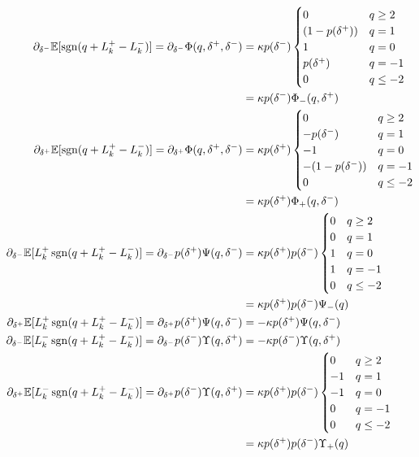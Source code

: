 \begin{align}
\partial_{\delta^-} \mathbb{E} [\operatorname{\mathrm{sgn}}(q + L_k^+ - L_k^-)] = \partial_{\delta^-} \Phi(q, \delta^+, \delta^-) & = \kappa p(\delta^-) \begin{cases} 
0 & q \geq 2 \\
(1-p(\delta^+)) & q = 1 \\
1 & q = 0 \\
p(\delta^+)  & q = -1 \\
0 & q \leq -2
\end{cases} \\
& = \kappa p(\delta^-) \Phi_-(q,\delta^+) \\
\partial_{\delta^+} \mathbb{E} [\operatorname{\mathrm{sgn}}(q + L_k^+ - L_k^-)] =\partial_{\delta^+} \Phi(q, \delta^+, \delta^-) & =  \kappa p(\delta^+) \begin{cases} 
0 & q \geq 2 \\
- p(\delta^-) & q = 1 \\
- 1 & q = 0 \\
- (1 - p(\delta^-)) & q = -1 \\
0 & q \leq -2
\end{cases} \\
& = \kappa p(\delta^+)\Phi_+(q,\delta^-) \\
\partial_{\delta^-} \mathbb{E} [L_k^+ \operatorname{\mathrm{sgn}}(q + L_k^+ - L_k^-)] = \partial_{\delta^-} p(\delta^+) \Psi(q, \delta^-) & = \kappa p(\delta^+) p(\delta^-)\begin{cases} 
0 & q \geq 2 \\
0 & q = 1 \\
1 & q = 0 \\
1 & q = -1 \\
0 & q \leq -2
\end{cases} \\
& = \kappa p(\delta^+) p(\delta^-) \Psi_-(q) \\
\partial_{\delta^+} \mathbb{E} [L_k^+ \operatorname{\mathrm{sgn}}(q + L_k^+ - L_k^-)] = \partial_{\delta^+} p(\delta^+) \Psi(q, \delta^-) & = -\kappa p(\delta^+) \Psi(q, \delta^-)
 \\
\partial_{\delta^-} \mathbb{E} [L_k^- \operatorname{\mathrm{sgn}}(q + L_k^+ - L_k^-)] = \partial_{\delta^-} p(\delta^-) \Upsilon(q, \delta^+) & = -\kappa p(\delta^-) \Upsilon(q, \delta^+)
 \\
 \partial_{\delta^+} \mathbb{E} [L_k^- \operatorname{\mathrm{sgn}}(q + L_k^+ - L_k^-)] = \partial_{\delta^+} p(\delta^-) \Upsilon(q, \delta^+)& = \kappa p(\delta^+) p(\delta^-) \begin{cases} 
0 & q \geq 2 \\
-1 & q = 1 \\
-1 & q = 0 \\
0 & q = -1 \\
0 & q \leq -2
\end{cases} \\
& = \kappa p(\delta^+) p(\delta^-)\Upsilon_+(q)
\end{align}

